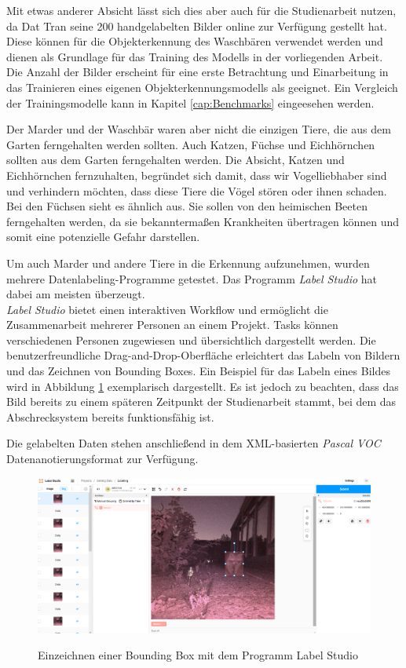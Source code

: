 Mit etwas anderer Absicht lässt sich dies aber auch für die Studienarbeit nutzen, da Dat Tran seine 200 handgelabelten Bilder online zur Verfügung gestellt hat. Diese können für die Objekterkennung des Waschbären verwendet werden und dienen als Grundlage für das Training des Modells in der vorliegenden Arbeit.\\
Die Anzahl der Bilder erscheint für eine erste Betrachtung und Einarbeitung in das Trainieren eines eigenen Objekterkennungsmodells als geeignet. Ein Vergleich der Trainingsmodelle kann in Kapitel \ref{cap:Benchmarks} eingeesehen werden.

Der Marder und der Waschbär waren aber nicht die einzigen Tiere, die aus dem Garten ferngehalten werden sollten. Auch Katzen, Füchse und Eichhörnchen sollten aus dem Garten ferngehalten werden. Die Absicht, Katzen und Eichhörnchen fernzuhalten, begründet sich damit, dass wir Vogelliebhaber sind und verhindern möchten, dass diese Tiere die Vögel stören oder ihnen schaden.
\\
Bei den Füchsen sieht es ähnlich aus. Sie sollen von den heimischen Beeten ferngehalten werden, da sie bekanntermaßen Krankheiten übertragen können und somit eine potenzielle Gefahr darstellen.

Um auch Marder und andere Tiere in die Erkennung aufzunehmen, wurden mehrere Datenlabeling-Programme getestet. Das Programm \textit{Label Studio} hat dabei am meisten überzeugt.
\\
\textit{Label Studio} bietet einen interaktiven Workflow und ermöglicht die Zusammenarbeit mehrerer Personen an einem Projekt. Tasks können verschiedenen Personen zugewiesen und übersichtlich dargestellt werden. Die benutzerfreundliche Drag-and-Drop-Oberfläche erleichtert das Labeln von Bildern und das Zeichnen von Bounding Boxes. Ein Beispiel für das Labeln eines Bildes wird in Abbildung \ref{fig:label_studio} exemplarisch dargestellt. Es ist jedoch zu beachten, dass das Bild bereits zu einem späteren Zeitpunkt der Studienarbeit stammt, bei dem das Abschrecksystem bereits funktionsfähig ist. \cite{labelstudio}

Die gelabelten Daten stehen anschließend in dem XML-basierten \textit{Pascal VOC} Datenanotierungsformat zur Verfügung.

\begin{figure}[h]
    \centering
    \includegraphics[width=\textwidth]{images/label_studio.png}
    \label{fig:label_studio}
    \caption{Einzeichnen einer Bounding Box mit dem Programm Label Studio}
\end{figure}

